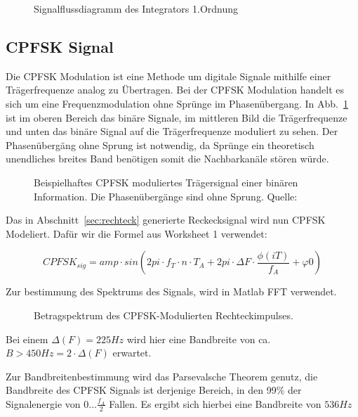 \documentclass{article}
\begin{document}
\begin{figure}[!h]
    \centering
    \def\svgscale{0.3}
    \caption{Signalflussdiagramm des Integrators 1.Ordnung}
\end{figure}

\subsection{CPFSK Signal}

Die \ac{CPFSK} Modulation ist eine Methode um digitale Signale mithilfe einer Trägerfrequenze analog zu Übertragen.
Bei der \ac{CPFSK} Modulation handelt es sich um eine Frequenzmodulation ohne Sprünge im Phasenübergang. In Abb.~\ref{fsk}
ist im oberen Bereich das binäre Signale, im mittleren Bild die Trägerfrequenze und unten das binäre Signal auf die Trägerfrequenze
moduliert zu sehen. Der Phasenübergäng ohne Sprung ist notwendig, da Sprünge ein theoretisch unendliches breites Band benötigen
somit die Nachbarkanäle stören würde.
\begin{figure}[!h]
    \centering
    \def\svgscale{0.3}
    \def\svgwidth{\columnwidth}
    \caption{Beispielhaftes \ac{CPFSK} moduliertes Trägersignal einer binären 
    Information. Die Phasenübergänge sind ohne Sprung. Quelle:~\cite{wiki:fsk}}
    \label{fsk}
\end{figure}

Das in Abschnitt~\ref{sec:rechteck} generierte Reckecksignal wird nun CPFSK Modeliert.
Dafür wir die Formel aus Worksheet 1 verwendet:

$$CPFSK_{sig} = amp \cdot  sin(2  pi \cdot f_T \cdot n \cdot T_A + 2 pi \cdot \varDelta{F} \cdot \frac{\phi (iT)}{f_A} + \varphi{0}) $$

Zur bestimmung des Spektrums des Signals, wird in Matlab FFT verwendet.
\begin{figure}[!h]
    \centering
    \def\svgscale{0.3}
    \def\svgwidth{\columnwidth}
    \caption{Betragspektrum des CPFSK-Modulierten Rechteckimpulses.}
\end{figure}
Bei einem $\varDelta(F) = 225Hz$ wird hier eine Bandbreite von ca. $B > 450Hz = 2\cdot \varDelta(F) $ erwartet.

Zur Bandbreitenbestimmung wird das Parsevalsche Theorem genutz, die Bandbreite des CPFSK Signals ist derjenige Bereich,
in den 99\% der Signalenergie von $0...\frac{f_A}{2}$ Fallen. Es ergibt sich hierbei eine Bandbreite von $536Hz$
\end{document}
